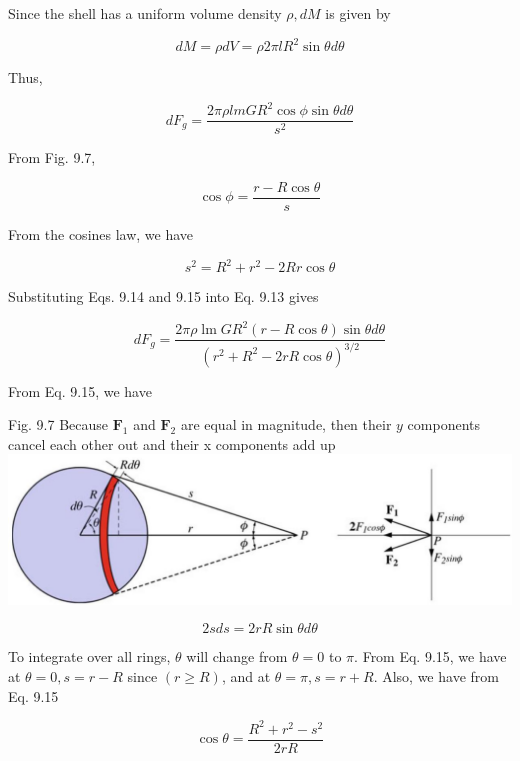 \documentclass[10pt]{article}
\begin{document}
Since the shell has a uniform volume density $\rho, d M$ is given by

$$
d M=\rho d V=\rho 2 \pi l R^{2} \sin \theta d \theta
$$

Thus,


\begin{equation*}
d F_{g}=\frac{2 \pi \rho l m G R^{2} \cos \phi \sin \theta d \theta}{s^{2}} \tag{9.13}
\end{equation*}


From Fig. 9.7,


\begin{equation*}
\cos \phi=\frac{r-R \cos \theta}{s} \tag{9.14}
\end{equation*}


From the cosines law, we have


\begin{equation*}
s^{2}=R^{2}+r^{2}-2 R r \cos \theta \tag{9.15}
\end{equation*}


Substituting Eqs. 9.14 and 9.15 into Eq. 9.13 gives


\begin{equation*}
d F_{g}=\frac{2 \pi \rho \operatorname{lm} G R^{2}(r-R \cos \theta) \sin \theta d \theta}{\left(r^{2}+R^{2}-2 r R \cos \theta\right)^{3 / 2}} \tag{9.16}
\end{equation*}


From Eq. 9.15, we have

Fig. 9.7 Because $\mathbf{F}_{1}$ and $\mathbf{F}_{2}$ are equal in magnitude, then their $y$ components cancel each other out and their x components add up\\
\includegraphics[max width=\textwidth, center]{2024_09_13_db1f357d2aad0a03eb2eg-147(1)}

$$
2 s d s=2 r R \sin \theta d \theta
$$

To integrate over all rings, $\theta$ will change from $\theta=0$ to $\pi$. From Eq. 9.15, we have at $\theta=0, s=r-R$ since $(r \geq R)$, and at $\theta=\pi, s=r+R$. Also, we have from Eq. 9.15

$$
\cos \theta=\frac{R^{2}+r^{2}-s^{2}}{2 r R}
$$
\end{document}
